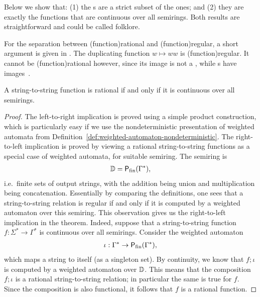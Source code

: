 Below we show that: (1) the s are a strict subset of the  ones; and (2) they are exactly the functions that are continuous over all semirings. Both results are straightforward and could be called folklore.

\begin{myexample}
    For the separation between \kl(function){rational} and \kl(function){regular}, a short argument is given in \cite[p. 218]{engelfrietMSODefinableString2001}. The duplicating function $w \mapsto ww$ is \kl(function){regular}. It cannot be \kl(function){rational} however, since its image is not a , while s have  images~\cite[Theorem IX.3.1]{Eilenberg74}.
\end{myexample}





\begin{theorem}\label{thm:rational-functions}
    A string-to-string function is rational if and only if it is continuous over all semirings.
\end{theorem}
\begin{proof}
    The left-to-right implication is proved using a simple product construction, which is particularly easy if we use the nondeterministic presentation of weighted automata from Definition~\ref{def:weighted-automaton-nondeterministic}. The right-to-left implication is proved by viewing a rational string-to-string functions as a special case of weighted automata, for suitable semiring. The semiring is 
    \begin{align*}
    \mathbb D = \mathsf{P}_{\mathrm{fin}}(\Gamma^*),
    \end{align*}
    i.e.~finite sets of output strings, with the addition being union and multiplication being concatenation. Essentially by comparing the definitions, one sees that a string-to-string relation is regular if and only if it is computed by a weighted automaton over this semiring. This observation gives us the right-to-left implication in the theorem. Indeed, suppose that a string-to-string function $f : \Sigma^* \to \Gamma^*$ is continuous over all semirings. Consider the weighted automaton 
    \begin{align*}
    \iota : \Gamma^* \to \mathsf{P}_{\mathrm{fin}}(\Gamma^*),
    \end{align*}
    which maps a string to itself (as a singleton set). By continuity, we know that $f; \iota$ is computed by a weighted automaton over $\mathbb D$. This means that the composition $f;\iota$ is a rational string-to-string relation; in particular the same is true for $f$. Since the composition is also functional, it follows that $f$ is a rational function. 
\end{proof}


